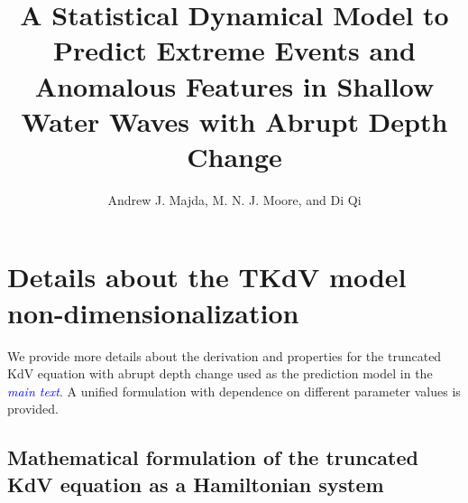 \documentclass[9pt,twoside,lineno]{pnas-new}
\title{A Statistical Dynamical Model to Predict
Extreme Events and Anomalous Features in Shallow Water Waves with
Abrupt Depth Change}
\author{Andrew J. Majda, M. N. J. Moore, and Di Qi}
\theoremstyle{plain}
\theoremstyle{plain}
\begin{document}
\appendix

\maketitle
\SItext


\section{Details about the TKdV model non-dimensionalization}

We provide more details about the derivation and properties for the
truncated KdV equation with abrupt depth change used as the prediction
model in the \textcolor{blue}{\emph{main text}}. A unified formulation with dependence on
different parameter values is provided.

\subsection{Mathematical formulation of the truncated KdV equation as a Hamiltonian
system}
\end{document}
